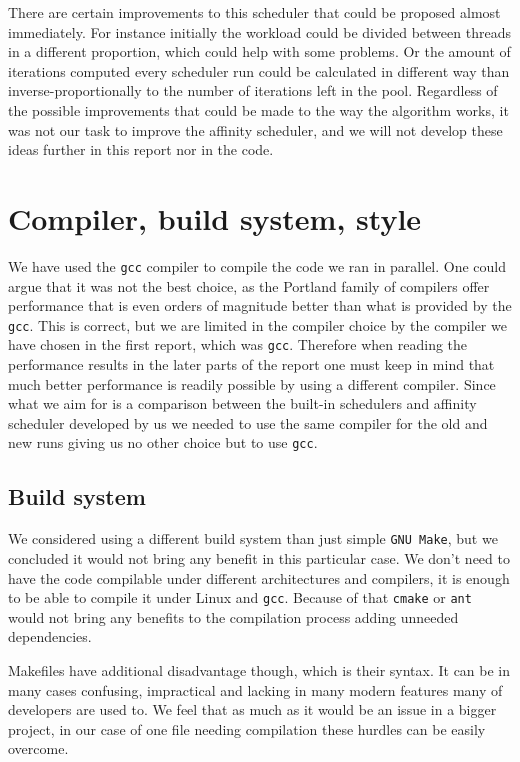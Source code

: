 \documentclass[11pt,a4paper]{article}
\begin{document}
There are certain improvements to this scheduler that could be proposed almost immediately. For instance initially the workload could be divided between threads in a different proportion, which could help with some problems. 
Or the amount of iterations computed every scheduler run could be calculated in different way than inverse-proportionally to the number of iterations left in the pool.
Regardless of the possible improvements that could be made to the way the algorithm works, it was not our task to improve the affinity scheduler, and we will not develop these ideas further in this report nor in the code.

\section{Compiler, build system, style}
We have used the \texttt{gcc} compiler to compile the code we ran in parallel.
One could argue that it was not the best choice, as the Portland family of compilers offer performance that is even orders of magnitude better than what is provided by the \texttt{gcc}. 
This is correct, but we are limited in the compiler choice by the compiler we have chosen in the first report, which was \texttt{gcc}. 
Therefore when reading the performance results in the later parts of the report one must keep in mind that much better performance is readily possible by using a different compiler. 
Since what we aim for is a comparison between the built-in schedulers and affinity scheduler developed by us we needed to use the same compiler for the old and new runs giving us no other choice but to use \texttt{gcc}.

\subsection{Build system}
We considered using a different build system than just simple \texttt{GNU Make}, but we concluded it would not bring any benefit in this particular case. 
We don't need to have the code compilable under different architectures and compilers, it is enough to be able to compile it under Linux and \texttt{gcc}. 
Because of that \texttt{cmake} or \texttt{ant} would not bring any benefits to the compilation process adding unneeded dependencies. 

Makefiles have additional disadvantage though, which is their syntax. 
It can be in many cases confusing, impractical and lacking in many modern features many of developers are used to.
We feel that as much as it would be an issue in a bigger project, in our case of one file needing compilation these hurdles can be easily overcome.
\end{document}
